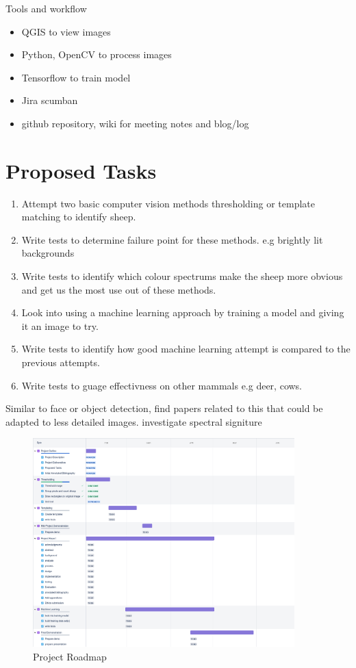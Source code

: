 \documentclass[11pt,fleqn,twoside]{article}
\begin{document}
Tools and workflow

\begin{itemize}
    \item QGIS to view images
    \item Python, OpenCV to process images
    \item Tensorflow to train model
    \item Jira scumban 
    \item github repository, wiki for meeting notes and blog/log
\end{itemize}

\section{Proposed Tasks}
\begin{enumerate}
    \item Attempt two basic computer vision methods thresholding or template matching to identify sheep. 
    \item Write tests to determine failure point for these methods. e.g brightly lit backgrounds
    \item Write tests to identify which colour spectrums make the sheep more obvious and get us the most use out of these methods.
    \item Look into using a machine learning approach by training a model and giving it an image to try. 
    \item Write tests to identify how good machine learning attempt is compared to the previous attempts.
    \item Write tests to guage effectivness on other mammals e.g deer, cows.
\end{enumerate}


Similar to face or object detection, find papers related to this that could be adapted to less detailed images.
investigate spectral signiture

\begin{figure}[ht]
    \caption{Project Roadmap}
    \center
    \includegraphics[width=0.9\textwidth]{where_smysheep_2020-02-07_0958am.png}
\end{figure}
\end{document}
